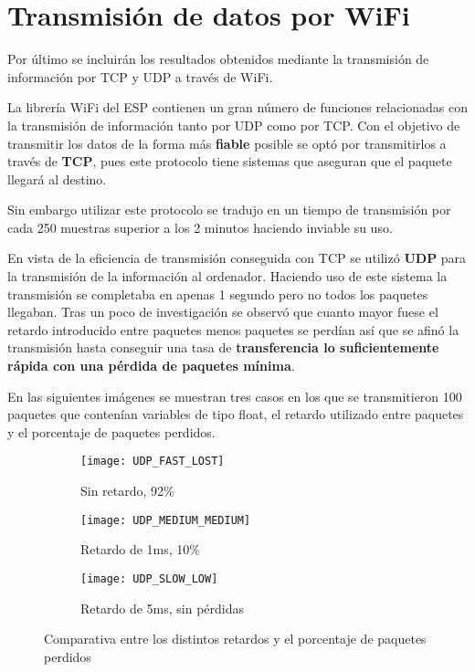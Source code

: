 \section{Transmisión de datos por WiFi\label{Resultados_UDP}}

Por último se incluirán los resultados obtenidos mediante la transmisión de información por TCP y UDP a través de WiFi.

La librería WiFi del ESP contienen un gran número de funciones relacionadas con la transmisión de información tanto por UDP como por TCP.
Con el objetivo de transmitir los datos de la forma más \textbf{fiable} posible se optó por transmitirlos a través de \textbf{TCP}, pues este protocolo tiene sistemas que aseguran que el paquete llegará al destino.

Sin embargo utilizar este protocolo se tradujo en un tiempo de transmisión por cada 250 muestras superior a los 2 minutos haciendo inviable su uso.

En vista de la eficiencia de transmisión conseguida con TCP se utilizó \textbf{UDP} para la transmisión de la información al ordenador. Haciendo uso de este sistema la transmisión se completaba en apenas 1 segundo pero no todos los paquetes llegaban. Tras un poco de investigación se observó que cuanto mayor fuese el retardo introducido entre paquetes menos paquetes se perdían así que se afinó la transmisión hasta conseguir una tasa de \textbf{transferencia lo suficientemente rápida con una pérdida de paquetes mínima}.

\clearpage

En las siguientes imágenes se muestran tres casos en los que se transmitieron 100 paquetes que contenían variables de tipo float, el retardo utilizado entre paquetes y el porcentaje de paquetes perdidos.

\begin{figure}[h]
\centering
  \begin{subfigure}[b]{7cm}
   	\centering
    \texttt{[image: UDP\_FAST\_LOST]}
    \caption{Sin retardo, 92\%}
    \label{fig:UDP_FAST_LOST}
  \end{subfigure}
  \begin{subfigure}[b]{7cm}
  	\centering
    \texttt{[image: UDP\_MEDIUM\_MEDIUM]}
    \caption{Retardo de 1ms, 10\%}
    \label{fig:UDP_MEDIUM_MEDIUM}
  \end{subfigure}
    \begin{subfigure}[b]{7cm}
  	\centering
    \texttt{[image: UDP\_SLOW\_LOW]}
    \caption{Retardo de 5ms, sin pérdidas}
    \label{fig:UDP_SLOW_LOW}
  \end{subfigure}
  \caption{Comparativa entre los distintos retardos y el porcentaje de paquetes perdidos}
  \label{fig:LABEL}
\end{figure}

